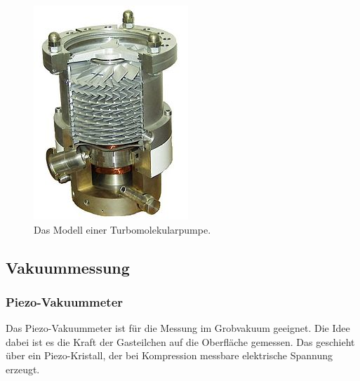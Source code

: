         \begin{figure}[H]
            \centering
            \includegraphics[width=\textwidth]{bilder/Turbomolekularpumpe}
            \caption{Das Modell einer Turbomolekularpumpe.\cite{turboBild}}
            \label{fig:Turbomolekularpumpe}
        \end{figure}

    \subsection{Vakuummessung}
        \subsubsection{Piezo-Vakuummeter}
            Das Piezo-Vakuummeter ist für die Messung im Grobvakuum geeignet.
            Die Idee dabei ist es die Kraft der Gasteilchen auf die Oberfläche gemessen.
            Das geschieht über ein Piezo-Kristall, der bei Kompression messbare elektrische Spannung erzeugt.

